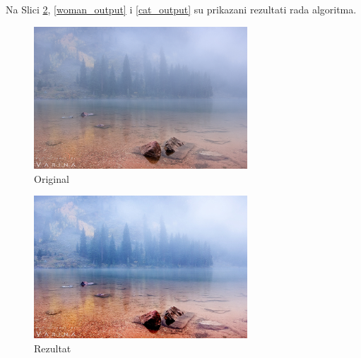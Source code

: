 \documentclass[12pt,a4paper]{article}
\theoremstyle{definition}
\theoremstyle{remark}
\theoremstyle{plain}
\begin{document}
\newpage
Na Slici \ref{river_output}, \ref{woman_output} i \ref{cat_output} su prikazani rezultati rada algoritma.

\begin{multicols}{2}
\begin{figure}[H]
\centering
\includegraphics[width=8cm]{images/river.jpg}
  \caption{Original}\label{river}
\end{figure}
\columnbreak
\begin{figure}[H]
\centering
\includegraphics[width=8cm]{images/fuzzy_color_1.jpg}
  \caption{Rezultat}\label{river_output}
\end{figure}
\end{multicols}
\end{document}
